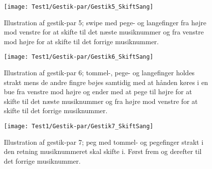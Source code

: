 \noindent
%
%
\begin{figure}[H]
	\centering
	\texttt{[image: Test1/Gestik-par/Gestik5\_SkiftSang]}
	\caption{Illustration af gestik-par 5; swipe med pege- og langefinger fra højre mod venstre for at skifte til det næste musiknummer og fra venstre mod højre for at skifte til det forrige musiknummer.}
	\label{fig:GestikPar5SkiftApp}
\end{figure}
\noindent
%
%
\begin{figure}[H]
	\centering
	\texttt{[image: Test1/Gestik-par/Gestik6\_SkiftSang]}
	\caption{Illustration af gestik-par 6; tommel-, pege- og langefinger holdes strakt mens de andre fingre bøjes samtidig med at hånden køres i en bue fra venstre mod højre og ender med at pege til højre for at skifte til det næste musiknummer og fra højre mod venstre for at skifte til det forrige musiknummer.}
	\label{fig:GestikPar6SkiftApp}
\end{figure}
\noindent
%
%
\begin{figure}[H]
	\centering
	\texttt{[image: Test1/Gestik-par/Gestik7\_SkiftSang]}
	\caption{Illustration af gestik-par 7; peg med tommel- og pegefinger strakt i den retning musiknummeret skal skifte i. Først frem og derefter til det forrige musiknummer.}
	\label{fig:GestikPar7SkiftApp}
\end{figure}
\noindent
%

